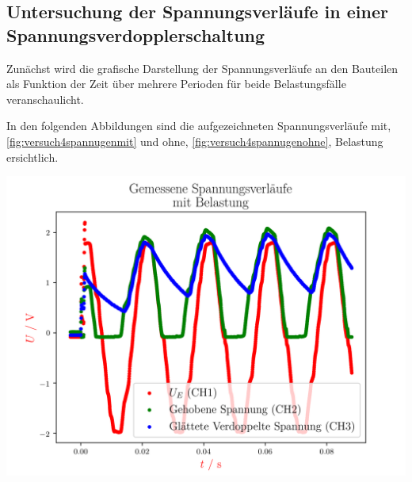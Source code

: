 \documentclass[11pt,ngerman]{scrartcl}
\begin{document}
\vspace{5mm}

\subsection{Untersuchung der Spannungsverläufe in einer Spannungsverdopplerschaltung}

Zunächst wird die grafische Darstellung der Spannungsverläufe an den Bauteilen als Funktion der Zeit
über mehrere Perioden für beide Belastungsfälle veranschaulicht.

\vspace{2mm}

In den folgenden Abbildungen sind die aufgezeichneten Spannungsverläufe
mit, \autoref{fig:versuch4spannugenmit} und ohne,
\autoref{fig:versuch4spannugenohne}, Belastung ersichtlich.

\begin{center}
	\begin{minipage}[t]{0.8\textwidth}
		\includegraphics[width=\textwidth]{./figures/halbleiter/Versuch4/versuch4spannugenmit.png}
		\label{fig:versuch4spannugenmit}
	\end{minipage}
\end{center}
\end{document}
